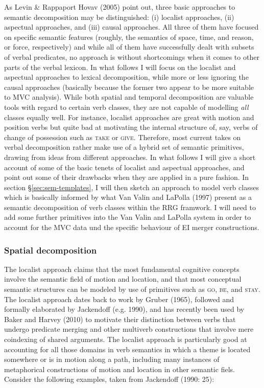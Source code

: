As Levin \& Rappaport Hovav (2005) point out, three basic approaches to semantic decomposition may be distinguished: (i) localist approaches, (ii) aspectual approaches, and (iii) causal approaches. All three of them have focused on specific semantic features (roughly, the semantics of space, time, and reason, or force, respectively) and while all of them have successfully dealt with subsets of verbal predicates, no approach is without shortcomings when it comes to other parts of the verbal lexicon. In what follows I will focus on the localist and aspectual approaches to lexical decomposition, while more or less ignoring the causal approaches (basically because the former two appear to be more suitable to MVC analysis). While both spatial and temporal decomposition are valuable tools with regard to certain verb classes, they are not capable of modelling \textit{all} classes equally well. For instance, localist approaches are great with motion and position verbs but quite bad at motivating the internal structure of, say, verbs of change of possession such as \textsc{take} or \textsc{give}. Therefore, most current takes on verbal decomposition rather make use of a hybrid set of semantic primitives, drawing from ideas from different approaches. In what follows I will give a short account of some of the basic tenets of localist and aspectual approaches, and point out some of their drawbacks when they are applied in a pure fashion. In section §\ref{sec:sem-templates}, I will then sketch an approach to model verb classes which is basically informed by what Van Valin and LaPolla (1997) present as a semantic decomposition of verb classes within the RRG framwork. I will need to add some further primitives into the Van Valin and LaPolla system in order to account for the MVC data und the specific behaviour of EI merger constructions.

\subsubsection{Spatial decomposition}

The localist approach claims that the most fundamental cognitive concepts involve the semantic field of motion and location, and that most conceptual semantic structures can be modeled by use of primitives such as \textsc{go}, \textsc{be}, and \textsc{stay}. The localist approach dates back to work by Gruber (1965), followed and formally elaborated by Jackendoff (e.g. 1990), and has recently been used by Baker and Harvey (2010) to motivate their distinction between verbs that undergo predicate merging and other multiverb constructions that involve mere coindexing of shared arguments. The localist approach is particularly good at accounting for all those domains in verb semantics in which a theme is located somewhere or is in motion along a path, including many instances of metaphorical constructions of motion and location in other semantic fiels. Consider the following examples, taken from Jackendoff (1990: 25):

